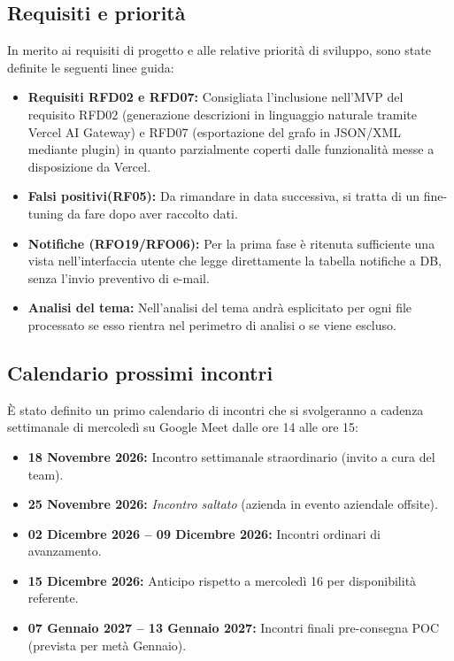 \subsection{Requisiti e priorità}
In merito ai requisiti di progetto e alle relative priorità di sviluppo, sono state definite le seguenti linee guida:
\begin{itemize}
    \item \textbf{Requisiti RFD02 e RFD07:} Consigliata l'inclusione nell'MVP del requisito RFD02 (generazione descrizioni in linguaggio naturale tramite Vercel AI Gateway) e RFD07 (esportazione del grafo in JSON/XML mediante plugin) in quanto parzialmente coperti dalle funzionalità messe a disposizione da Vercel.
    \item \textbf{Falsi positivi(RF05):} Da rimandare in data successiva, si tratta di un fine-tuning da fare dopo aver raccolto dati.
    \item \textbf{Notifiche (RFO19/RFO06):} Per la prima fase è ritenuta sufficiente una vista nell'interfaccia utente che legge direttamente la tabella notifiche a DB, senza l'invio preventivo di e-mail.
    \item \textbf{Analisi del tema:} Nell'analisi del tema andrà esplicitato per ogni file processato se esso rientra nel perimetro di analisi o se viene escluso.
\end{itemize}

\subsection{Calendario prossimi incontri}
È stato definito un primo calendario di incontri che si svolgeranno a cadenza settimanale di mercoledì su Google Meet dalle ore 14 alle ore 15:
\begin{itemize}
    \item \textbf{18 Novembre 2026:} Incontro settimanale straordinario (invito a cura del team).
    \item \textbf{25 Novembre 2026:} \textit{Incontro saltato} (azienda in evento aziendale offsite).
    \item \textbf{02 Dicembre 2026 -- 09 Dicembre 2026:} Incontri ordinari di avanzamento.
    \item \textbf{15 Dicembre 2026:} Anticipo rispetto a mercoledì 16 per disponibilità referente.
    \item \textbf{07 Gennaio 2027 -- 13 Gennaio 2027:} Incontri finali pre-consegna POC (prevista per metà Gennaio).
\end{itemize}

